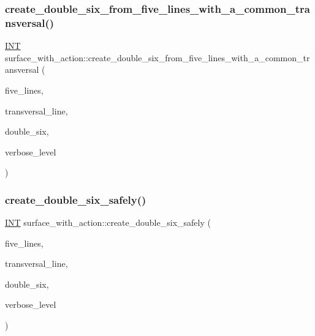 \subsubsection{\texorpdfstring{create\+\_\+double\+\_\+six\+\_\+from\+\_\+five\+\_\+lines\+\_\+with\+\_\+a\+\_\+common\+\_\+transversal()}{create\_double\_six\_from\_five\_lines\_with\_a\_common\_transversal()}}
{\footnotesize\ttfamily \mbox{\hyperlink{galois_8h_a09fddde158a3a20bd2dcadb609de11dc}{I\+NT}} surface\+\_\+with\+\_\+action\+::create\+\_\+double\+\_\+six\+\_\+from\+\_\+five\+\_\+lines\+\_\+with\+\_\+a\+\_\+common\+\_\+transversal (\begin{DoxyParamCaption}\item[{\mbox{\hyperlink{galois_8h_a09fddde158a3a20bd2dcadb609de11dc}{I\+NT}} $\ast$}]{five\+\_\+lines,  }\item[{\mbox{\hyperlink{galois_8h_a09fddde158a3a20bd2dcadb609de11dc}{I\+NT}}}]{transversal\+\_\+line,  }\item[{\mbox{\hyperlink{galois_8h_a09fddde158a3a20bd2dcadb609de11dc}{I\+NT}} $\ast$}]{double\+\_\+six,  }\item[{\mbox{\hyperlink{galois_8h_a09fddde158a3a20bd2dcadb609de11dc}{I\+NT}}}]{verbose\+\_\+level }\end{DoxyParamCaption})}

\mbox{\label{classsurface__with__action_a5d151dc90786f5466eb08dc1e2939170}} 
\subsubsection{\texorpdfstring{create\+\_\+double\+\_\+six\+\_\+safely()}{create\_double\_six\_safely()}}
{\footnotesize\ttfamily \mbox{\hyperlink{galois_8h_a09fddde158a3a20bd2dcadb609de11dc}{I\+NT}} surface\+\_\+with\+\_\+action\+::create\+\_\+double\+\_\+six\+\_\+safely (\begin{DoxyParamCaption}\item[{\mbox{\hyperlink{galois_8h_a09fddde158a3a20bd2dcadb609de11dc}{I\+NT}} $\ast$}]{five\+\_\+lines,  }\item[{\mbox{\hyperlink{galois_8h_a09fddde158a3a20bd2dcadb609de11dc}{I\+NT}}}]{transversal\+\_\+line,  }\item[{\mbox{\hyperlink{galois_8h_a09fddde158a3a20bd2dcadb609de11dc}{I\+NT}} $\ast$}]{double\+\_\+six,  }\item[{\mbox{\hyperlink{galois_8h_a09fddde158a3a20bd2dcadb609de11dc}{I\+NT}}}]{verbose\+\_\+level }\end{DoxyParamCaption})}

